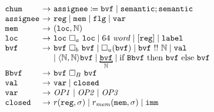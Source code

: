 \begin{figure}[thb]
\[
\hspace{-1ex}
\begin{array}{lcl}
	\mathtt{chum} \hspace{-1.5ex}&\rightarrow&\hspace{-1.5ex} \mathtt{assignee} \coloneqq \mathtt{bvf}\mid \mathtt{semantic} ; \mathtt{semantic}\\
	\mathtt{assignee} \hspace{-1.5ex}&\rightarrow&\hspace{-1.5ex} \mathtt{reg} \mid \mathtt{mem} \mid \mathtt{flg} \mid \mathtt{var} \\	
	\mathtt{mem} \hspace{-1.5ex}&\rightarrow&\hspace{-1.5ex} (\mathtt{loc}, \mathbb{N}) \\
	\mathtt{loc} \hspace{-1.5ex}&\rightarrow&\hspace{-1.5ex} \mathtt{loc}~\Box_a~\mathtt{loc} \mid 64~\var{word} \mid [\mathtt{reg}] \mid \mathtt{label} \\
	\mathtt{bvf} \hspace{-1.5ex}&\rightarrow&\hspace{-1.5ex} \mathtt{bvf}~\Box_b~\mathtt{bvf} \mid \Box_u(\mathtt{bvf}) \mid \mathtt{bvf} \testbit \mathbb{N} \mid \mathtt{val}\\
	 &&\hspace{-1.5ex}\mid \langle \mathbb{N}, \mathbb{N}\rangle \mathtt{bvf}	 \mid \bitmoded{\mathbb{N}}{\mathtt{bvf}} \mid \mbox{if~} \mathtt{Bbvf} \mbox{~then~} \mathtt{bvf} \mbox{~else~} \mathtt{bvf}  \\
	\mathtt{Bbvf} \hspace{-1.5ex}&\rightarrow&\hspace{-1.5ex} \mathtt{bvf}~\Box_B~\mathtt{bvf} \\
	\mathtt{val} \hspace{-1.5ex}&\rightarrow&\hspace{-1.5ex} \mathtt{var} \mid \mathtt{closed} \\
    \mathtt{var} \hspace{-1.5ex}&\rightarrow&\hspace{-1.5ex} \var{OP1} \mid \var{OP2} \mid \var{OP3} \\
     \mathtt{closed}\hspace{-1.5ex}&\rightarrow&\hspace{-1.5ex} r(\mathtt{reg}, \sigma) \mid r_\var{mem}(\mathtt{mem},\sigma)	\mid \mathtt{imm}\\

\end{array}\]
\end{figure}
